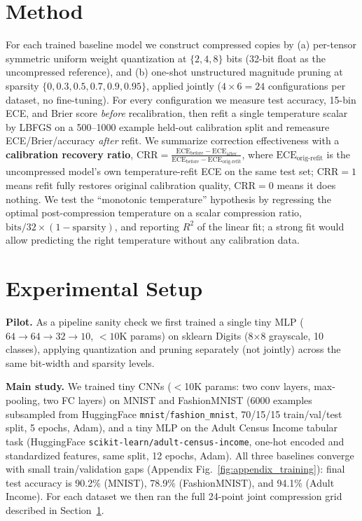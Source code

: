 \documentclass{article} %
\theoremstyle{plain}
\theoremstyle{definition}
\theoremstyle{remark}
\begin{document}
\section{Method}
\label{sec:method}
For each trained baseline model we construct compressed copies by (a) per-tensor symmetric uniform weight quantization at $\{2,4,8\}$ bits (32-bit float as the uncompressed reference), and (b) one-shot unstructured magnitude pruning at sparsity $\{0,0.3,0.5,0.7,0.9,0.95\}$, applied jointly ($4\times6=24$ configurations per dataset, no fine-tuning). For every configuration we measure test accuracy, 15-bin ECE, and Brier score \emph{before} recalibration, then refit a single temperature scalar by LBFGS on a 500--1000 example held-out calibration split and remeasure ECE/Brier/accuracy \emph{after} refit. We summarize correction effectiveness with a \textbf{calibration recovery ratio}, $\mathrm{CRR} = \frac{\mathrm{ECE}_{\text{before}} - \mathrm{ECE}_{\text{after}}}{\mathrm{ECE}_{\text{before}} - \mathrm{ECE}_{\text{orig-refit}}}$, where $\mathrm{ECE}_{\text{orig-refit}}$ is the uncompressed model's own temperature-refit ECE on the same test set; $\mathrm{CRR}=1$ means refit fully restores original calibration quality, $\mathrm{CRR}=0$ means it does nothing. We test the ``monotonic temperature'' hypothesis by regressing the optimal post-compression temperature on a scalar compression ratio, $\text{bits}/32 \times (1-\text{sparsity})$, and reporting $R^2$ of the linear fit; a strong fit would allow predicting the right temperature without any calibration data.

\section{Experimental Setup}
\label{sec:experimental_setup}
\textbf{Pilot.} As a pipeline sanity check we first trained a single tiny MLP ($64\!\to\!64\!\to\!32\!\to\!10$, $<10$K params) on sklearn Digits (8$\times$8 grayscale, 10 classes), applying quantization and pruning separately (not jointly) across the same bit-width and sparsity levels.

\textbf{Main study.} We trained tiny CNNs ($<$10K params: two conv layers, max-pooling, two FC layers) on MNIST and FashionMNIST (6000 examples subsampled from HuggingFace \texttt{mnist}/\texttt{fashion\_mnist}, 70/15/15 train/val/test split, 5 epochs, Adam), and a tiny MLP on the Adult Census Income tabular task (HuggingFace \texttt{scikit-learn/adult-census-income}, one-hot encoded and standardized features, same split, 12 epochs, Adam). All three baselines converge with small train/validation gaps (Appendix Fig.~\ref{fig:appendix_training}): final test accuracy is 90.2\% (MNIST), 78.9\% (FashionMNIST), and 94.1\% (Adult Income). For each dataset we then ran the full 24-point joint compression grid described in Section~\ref{sec:method}.
\end{document}
